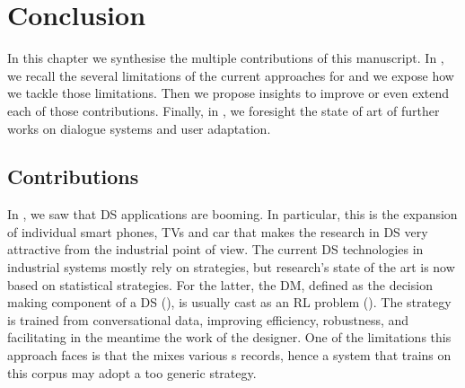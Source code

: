 \chapter{Conclusion}
\label{chapter:conclusion}

In this chapter we synthesise the multiple contributions of this manuscript. In , we recall the several limitations of the current approaches for   and we expose how we tackle those limitations. Then we propose insights to improve or even extend each of those contributions. Finally, in , we foresight the state of art of further works on dialogue systems and user adaptation.

\section{Contributions}
\label{sec:contribs}

In , we saw that \gls{DS} applications are booming. In particular, this is the expansion of individual smart phones, TVs and car that makes the research in \gls{DS} very attractive from the industrial point of view. 
The current \gls{DS} technologies in industrial systems mostly rely on  strategies, but research's state of the art is now based on statistical strategies. For the latter, the \acrfull{DM}, defined as the decision making component of a \gls{DS} (), is usually cast as an \acrfull{RL} problem (). The strategy is trained from conversational data, improving efficiency, robustness, and facilitating in the meantime the work of the designer. One of the limitations this approach faces is that the  mixes various s records, hence a system that trains on this corpus may adopt a too generic strategy.

